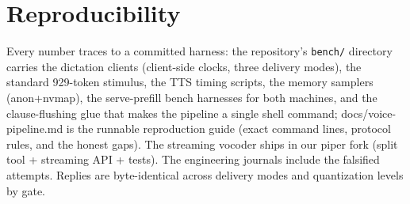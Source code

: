 \documentclass[journal]{IEEEtran}
\begin{document}

%


\appendices
\section{Reproducibility}
Every number traces to a committed harness: the repository's \verb|bench/| directory carries the dictation clients (client-side clocks, three delivery modes), the standard 929-token stimulus, the TTS timing scripts, the memory samplers (anon+nvmap), the serve-prefill bench harnesses for both machines, and the clause-flushing glue that makes the pipeline a single shell command; docs/voice-pipeline.md is the runnable reproduction guide (exact command lines, protocol rules, and the honest gaps). The streaming vocoder ships in our piper fork (split tool + streaming API + tests). The engineering journals include the falsified attempts. Replies are byte-identical across delivery modes and quantization levels by gate.

\end{document}
